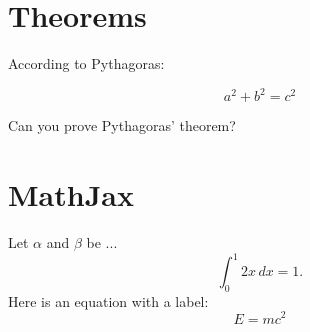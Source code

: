 \documentclass{camel}
\begin{document}
\chapter{Theorems}\label{ch:theorems}
According to Pythagoras:
\begin{theorem}
\[
a^2 + b^2 = c^2
\]
\end{theorem}

\begin{exercise}
Can you prove Pythagoras' theorem?
\end{exercise}

\chapter{MathJax}\label{ch:mathjax}
Let $\alpha$ and $\beta$ be ...
\[
\int_0^1 2x\,dx = 1. 
\]
Here is an equation with a label:
\begin{equation}\label{eq:einstein}
E = mc^2
\end{equation}

\end{document}
